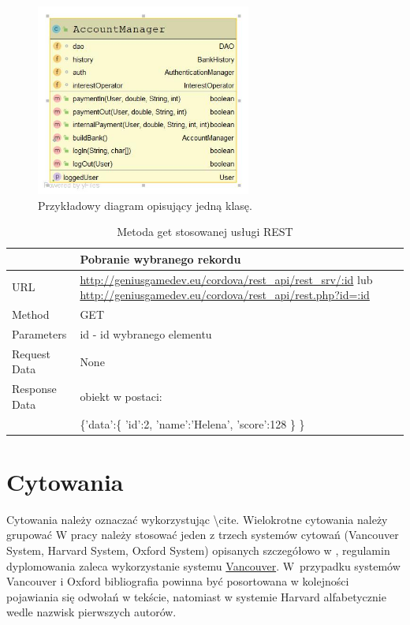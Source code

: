 \documentclass[twoside]{wfiisul}
\begin{document}
\begin{figure}[!h]
\centering
\includegraphics[width = 200pt]{DiagramKlasy.jpg}
\caption{Przykładowy diagram opisujący jedną klasę.}\label{diagram_wybranej_klasy}
\end{figure}

\begin{table}
\begin{tabularx}{\textwidth}{|l|X|}
\hline
&\textbf{Pobranie wybranego rekordu}\\\hline
URL &   \url{http://geniusgamedev.eu/cordova/rest_api/rest_srv/:id} lub \url{http://geniusgamedev.eu/cordova/rest_api/rest.php?id=:id}\\\hline
Method  & GET\\\hline
Parameters  & id - id wybranego elementu \\\hline
Request Data & None\\\hline
Response Data & obiekt w postaci:\\
&

\{'data':\{
    'id':2,
    'name':'Helena',
    'score':128
    \}
\}

\\\hline
\end{tabularx}
\caption{Metoda get stosowanej usługi REST}\label{rest1}
\end{table}

\section{Cytowania}
Cytowania należy oznaczać wykorzystując {\textbackslash}cite. Wielokrotne cytowania należy grupować \cite{Bekart, Cytowanie, latex_math_wiki, Procedura_dyplomowania} W pracy należy stosować jeden z trzech systemów cytowań (Vancouver System, Harvard System, Oxford System) opisanych szczegółowo w \cite{Cytowanie}, regulamin dyplomowania zaleca wykorzystanie systemu \underline{Vancouver}. W~przypadku systemów Vancouver i Oxford bibliografia powinna być posortowana w kolejności pojawiania się odwołań w tekście, natomiast w systemie Harvard alfabetycznie wedle nazwisk pierwszych autorów.
\end{document}
